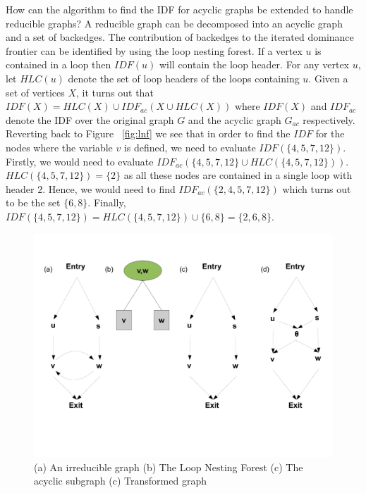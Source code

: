 {    How can the algorithm to find the IDF for acyclic graphs be extended to handle reducible graphs? 
    A reducible graph can be
    decomposed into an acyclic graph and a set of backedges. The contribution of backedges to the
    iterated dominance frontier can be identified by using the loop nesting forest. If a vertex $u$
    is contained in a loop then $IDF(u)$ will contain the loop header. For any vertex $u$, let $HLC(u)$
    denote the set of loop headers of the loops containing $u$. Given a set of vertices $X$, it turns
    out that $IDF(X) = HLC(X) \cup IDF_{ac}(X \cup HLC(X))$ where $IDF(X)$ and $IDF_{ac}$
    denote the IDF over the original graph $G$ and the acyclic graph $G_{ac}$ respectively. Reverting
    back to Figure ~\ref{fig:lnf} we see that in order to find the $IDF$ for the nodes where the variable 
    $v$ is defined, we need to evaluate $IDF(\{4,5,7,12\})$. Firstly, we would need to evaluate 
    $IDF_{ac}(\{4,5,7,12\} \cup HLC(\{4,5,7,12\}))$. $HLC(\{4,5,7,12\}) = \{2\}$ as all these nodes are contained 
    in a single loop with header $2$. Hence, we would need to find $IDF_{ac}(\{2,4,5,7,12\})$ which turns
    out to be the set $\{6,8\}$. Finally, $IDF(\{4,5,7,12\}) = HLC(\{4,5,7,12\}) \cup \{6,8\} = \{2,6,8\}$.
 
    \begin{figure}[htb]
    \centerline{\includegraphics[scale=0.3]{irred.pdf}}
    \caption{(a) An irreducible graph (b) The Loop Nesting Forest (c) The acyclic subgraph (c) Transformed
    graph}
    \label{fig:irred}
    \end{figure} 
 
}
